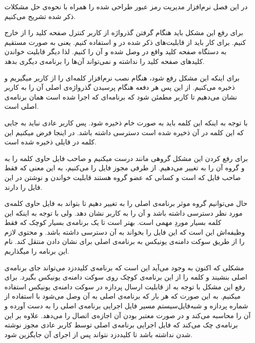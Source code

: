 
در این فصل نرم‌افزار مدیریت رمز عبور طراحی شده را همراه با نحوه‌ی حل مشکلات ذکر شده تشریح می‌کنیم.


برای رفع این مشکل باید هنگام گرفتن گذرواژه از کاربر کنترل صفحه کلید را از  خارج کنیم. برای کار باید از قابلیت‌های ذکر شده در  و   استفاده کنیم. یعنی به صورت مستقیم به دستگاه صفحه کلید واقع در  وصل شده و آن را  کنیم. لذا دیگر  قابلیت خواندن کلید‌های صفحه کلید را نداشته و نمی‌تواند آن‌ها را برنامه‌ی دیگری بدهد.


برای اینکه این مشکل رفع شود، هنگام نصب نرم‌افزار کلمه‌ای را از کاربر میگیریم و ذخیره می‌کنیم. از این پس هر دفعه هنگام پرسیدن گذرواژه‌ی اصلی آن را به کاربر نشان می‌دهیم تا کاربر مطمئن شود که برنامه‌ای که اجرا شده است همان برنامه‌ی اصلی است.

با توجه به اینکه این کلمه باید به صورت خام ذخیره شود. پس کاربر عادی نباید به جایی که این کلمه در آن ذخیره شده است دسترسی داشته باشد. در اینجا فرض میکنیم این کلمه در فایلی ذخیره شده است. 

برای رفع کردن این مشکل گروهی مانند  درست میکنیم و صاحب فایل حاوی کلمه را به  و گروه آن را به  تغییر می‌دهیم. از طرفی مجوز فایل را   می‌کنیم، به این معنی که فقط صاحب فایل که  است و کسانی که عضو گروه  هستند قابلیت خواندن و نوشتن در این فایل را دارند. 

حال می‌توانیم گروه موثر برنامه‌ی اصلی را به  تغییر دهیم تا بتواند به فایل حاوی کلمه‌ی مورد نظر دسترسی داشته باشد و آن را به کاربر نشان دهد. ولی با توجه به اینکه این کلمه بسیار موردِ مهمی است. بهتر است تا یک برنامه‌ی بسیار کوچک که فقط وظیفه‌اش این است که این فایل را بخواند به آن دسترسی داشته باشد. و محتوی لازم را از طریق سوکت دامنه‌ی یونیکس به برنامه‌ی اصلی برای نشان دادن منتقل کند. نام این برنامه را  میگذاریم.

مشکلی که اکنون به وجود می‌آید این است که برنامه‌ی کلیددزد می‌تواند جای برنامه‌ی اصلی بنشیند و کلمه را از این برنامه‌ی کوچک روی سوکت دامنه‌ی یونیکس بگیرد.
برای رفع این مشکل با توجه به  از قابلیت ارسال  پردازه در سوکت دامنه‌ی یونیکس استفاده میکنیم. به این صورت که  هر بار که برنامه‌ی اصلی به آن وصل می‌شود با استفاده از شماره پردازه و شبه‌فایل‌سیستم  مسیر فایل اجرایی برنامه‌ی اصلی را به دست آورده و  آن را محاسبه می‌کند و در صورت معتبر بودن آن اجازه‌ی اتصال را می‌دهد. علاوه بر این برنامه‌ی  چک می‌کند که فایل اجرایی برنامه‌ی اصلی توسط کاربر عادی مجوز نوشته شدن نداشته باشد تا کلیددزد نتواند پس از اجرای آن جایگزین شود.

